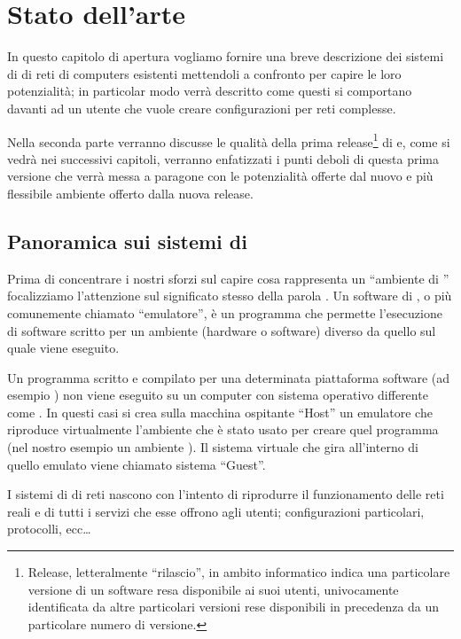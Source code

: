 \chapter{Stato dell'arte}\label{capitolo:arte}

In questo capitolo di apertura vogliamo fornire una breve descrizione dei sistemi di \emulazione{} di reti di computers esistenti mettendoli a confronto per capire le loro potenzialità; in particolar modo verrà descritto come questi si comportano davanti ad un utente che vuole creare configurazioni per reti complesse.

Nella seconda parte verranno discusse le qualità della prima release\footnote{Release, letteralmente ``rilascio'', in ambito informatico indica una particolare versione di un software resa disponibile ai suoi utenti, univocamente identificata da altre particolari versioni rese disponibili in precedenza da un particolare numero di versione.} di \visualnetkit{} e, come si vedrà nei successivi capitoli, verranno enfatizzati i punti deboli di questa prima versione che verrà messa a paragone con le potenzialità offerte dal nuovo e più flessibile ambiente offerto dalla nuova release.

\section{Panoramica sui sistemi di \emulazione{}}
Prima di concentrare i nostri sforzi sul capire cosa rappresenta un ``ambiente di \emulazione{}'' focalizziamo l'attenzione sul significato stesso della parola \emulazione{}. Un software di \emulazione{}, o più comunemente chiamato ``emulatore'', è un programma che permette l'esecuzione di software scritto per un ambiente (hardware o software) diverso da quello sul quale viene eseguito.

Un programma scritto e compilato per una determinata piattaforma software (ad esempio \windows) non viene eseguito su un computer con sistema operativo differente come \linux{}. In questi casi si crea sulla macchina ospitante ``Host'' un emulatore che riproduce virtualmente l'ambiente che è stato usato per creare quel programma (nel nostro esempio un ambiente \windows{}). Il sistema  virtuale che gira all'interno di quello emulato viene chiamato sistema ``Guest''.

I sistemi di \emulazione{} di reti nascono con l'intento di riprodurre il funzionamento delle reti reali e di tutti i servizi che esse offrono agli utenti; configurazioni particolari, protocolli, ecc\ldots

